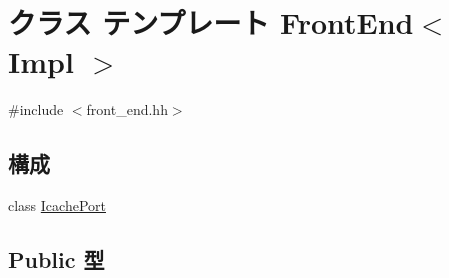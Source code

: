 \hypertarget{classFrontEnd}{
\section{クラス テンプレート FrontEnd$<$ Impl $>$}
\label{classFrontEnd}
}


{\ttfamily \#include $<$front\_\-end.hh$>$}\subsection*{構成}
\begin{DoxyCompactItemize}
\item 
class \hyperlink{classFrontEnd_1_1IcachePort}{IcachePort}
\end{DoxyCompactItemize}
\subsection*{Public 型}

